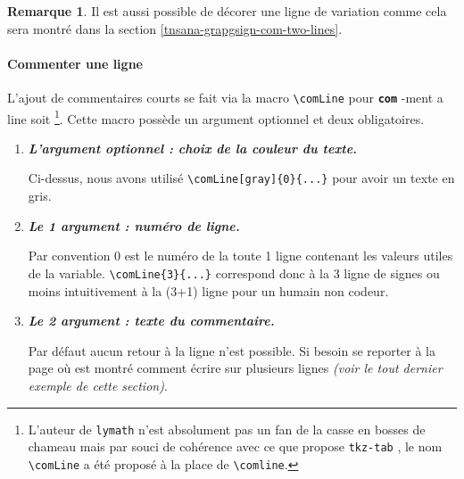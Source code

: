 \documentclass[12pt,a4paper]{article}
\makeatletter
\newcommand\env[1]{\texttt{#1}}
\newcommand\macro[1]{\env{\textbackslash{}#1}}
\theoremstyle{definition}
\newtheorem*{remark}{Remarque}
\newcommand\whyprefix[2]{%
	\textbf{\prefix{#1}}-#2%
}
\newcommand\prefix[1]{%
	\texttt{#1}%
}
\newcommand\inenglish{\@ifstar{\@inenglish@star}{\@inenglish@no@star}}
\newcommand\@inenglish@star[1]{%
	\emph{\og #1 \fg}%
}
\newcommand\@inenglish@no@star[1]{%
	\@inenglish@star{#1} en anglais%
}
\makeatother
\begin{document}
\begin{remark}
	Il est aussi possible de décorer une ligne de variation comme cela sera montré dans la section \ref{tnsana-grapgsign-com-two-lines}. 
\end{remark}




\paragraph{Commenter une ligne}

L'ajout de commentaires courts se fait via la macro \macro{comLine} pour \whyprefix{com}{ment a line} soit \inenglish{commenter une ligne}
\footnote{
    L'auteur de \prefix{lymath} n'est absolument pas un fan de la casse en bosses de chameau mais par souci de cohérence avec ce que propose \prefix{tkz-tab}, le nom \macro{comLine} a été proposé à la place de \macro{comline}.
}.
Cette macro possède un argument optionnel et deux obligatoires.

\begin{enumerate}
    \item \textbf{\emph{L'argument optionnel : choix de la couleur du texte.}}
          
          \smallskip
          
          Ci-dessus, nous avons utilisé \verb#\comLine[gray]{0}{...}# pour avoir un texte en gris.


    \medskip
    \item \textbf{\emph{Le 1\ier{} argument : numéro de ligne.}}
          
          \smallskip
          
          Par convention $0$ est le numéro de la toute 1\iere{} ligne contenant les valeurs utiles de la variable.
          \verb#\comLine{3}{...}# correspond donc à la 3\ieme{} ligne de signes ou moins intuitivement à la (3+1)\ieme{} ligne pour un humain non codeur.

    \medskip
    \item \textbf{\emph{Le 2\ieme{} argument : texte du commentaire.}}
          
          \smallskip
          
          Par défaut aucun retour à la ligne n'est possible.
          Si besoin se reporter à la  page \pageref{tnsana-grapgsign-com-two-lines} où est montré comment écrire sur plusieurs lignes \emph{(voir le tout dernier exemple de cette section)}.
\end{enumerate}
\end{document}
